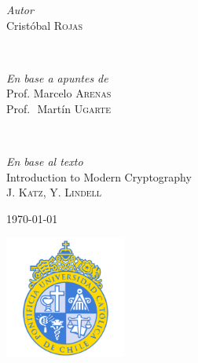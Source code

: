 \documentclass[letterpaper]{article}
\begin{document}
\begin{titlepage}
    \begin{minipage}{0.4\textwidth}
        \begin{flushleft}
            \large
            \textit{Autor}\\
            Cristóbal \textsc{Rojas} %
        \end{flushleft}
    \end{minipage}
    ~
    \begin{minipage}{0.4\textwidth}
        \begin{flushright}
            \large
            \textit{En base a apuntes de}\\
            Prof. Marcelo \textsc{Arenas} \\
            Prof.\,\, Martín \textsc{Ugarte}%
        \end{flushright}
    \end{minipage}
    ~
    \begin{minipage}{0.8\textwidth}
        \vspace{30pt}
        \begin{center}
            \large
            \textit{En base al texto}\\
            Introduction to Modern Cryptography \\
            J. \textsc{Katz}, Y. \textsc{Lindell}%
        \end{center}
    \end{minipage}



    \vfill\vfill\vfill %

    {\large\today} %


    \vfill\vfill
    \includegraphics[width=0.3\textwidth]{img/logo.png}\\[1cm] %


    \vfill %

\end{titlepage}
\end{document}
